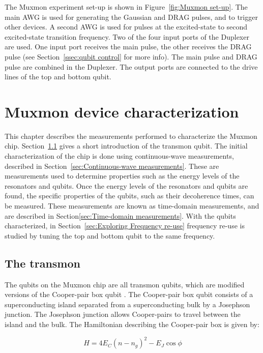       The Muxmon experiment set-up is shown in Figure~\ref{fig:Muxmon set-up}. The main AWG is used for generating the Gaussian and DRAG pulses, and to trigger other devices. A second AWG is used for pulses at the excited-state to second excited-state transition frequency. Two of the four input ports of the Duplexer are used. One input port receives the main pulse, the other receives the DRAG pulse (see Section~\ref{ssec:qubit control} for more info). The main pulse and DRAG pulse are combined in the Duplexer. The output ports are connected to the drive lines of the top and bottom qubit.

  \chapter{Muxmon device characterization}
    \label{ch:Muxmon device characterization}

    This chapter describes the measurements performed to characterize the Muxmon chip. Section~\ref{sec:The transmon} gives a short introduction of the transmon qubit. The initial characterization of the chip is done using continuous-wave measurements, described in Section~\ref{sec:Continuous-wave measurements}. These are measurements used to determine properties such as the energy levels of the resonators and qubits. Once the energy levels of the resonators and qubits are found, the specific properties of the qubits, such as their decoherence times, can be measured. These measurements are known as time-domain measurements, and are described in Section\ref{sec:Time-domain measurements}. With the qubits characterized, in Section~\ref{sec:Exploring Frequency re-use} frequency re-use is studied by tuning the top and bottom qubit to the same frequency.

    \section{The transmon}
      \label{sec:The transmon}
      The qubits on the Muxmon chip are all transmon qubits, which are modified versions of the Cooper-pair box qubit \cite{bouchiat1998CooperPairBox,nakamura1999coherent}. The Cooper-pair box qubit consists of a superconducting island separated from a superconducting bulk by a Josephson junction. The Josephson junction allows Cooper-pairs to travel between the island and the bulk. The Hamiltonian describing the Cooper-pair box is given by:

      \begin{equation}
        H=4 E_C (n - n_g)^2-E_J \cos \phi
        \label{eq:Cooper-pair box Hamiltonian}
      \end{equation}

